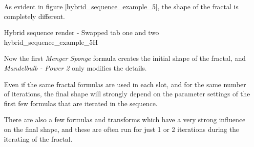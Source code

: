 As evident in figure \ref{hybrid_sequence_example_5}, the shape of the fractal is completely different.

{Hybrid sequence render - Swapped tab one and two}
{hybrid_sequence_example_5}{H}

Now the first \emph{Menger Sponge} formula creates the initial shape of the fractal, and \emph{Mandelbulb - Power 2} only modifies the details.

Even if the same fractal formulas are used in each slot, and for the same number of iterations, the final shape will strongly depend on the parameter settings of the first few formulas that are iterated in the sequence.

There are also a few formulas and transforms which have a very strong influence on the final shape, and these are often run for just 1 or 2 iterations during the iterating of the fractal.

